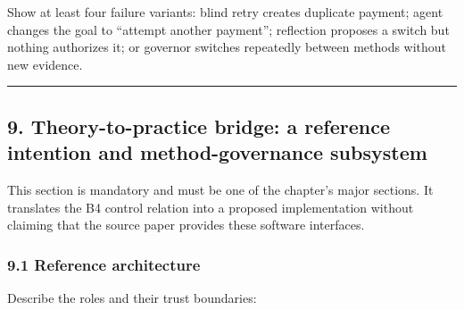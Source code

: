 Show at least four failure variants: blind retry creates duplicate payment; agent changes the goal to ``attempt another payment''; reflection proposes a switch but nothing authorizes it; or governor switches repeatedly between methods without new evidence.

\begin{center}\rule{0.5\linewidth}{0.5pt}\end{center}

\subsection{9. Theory-to-practice bridge: a reference intention and method-governance subsystem}\label{theory-to-practice-bridge-a-reference-intention-and-method-governance-subsystem}

This section is mandatory and must be one of the chapter's major sections. It translates the B4 control relation into a proposed implementation without claiming that the source paper provides these software interfaces.

\subsubsection{9.1 Reference architecture}\label{reference-architecture}

Describe the roles and their trust boundaries:

